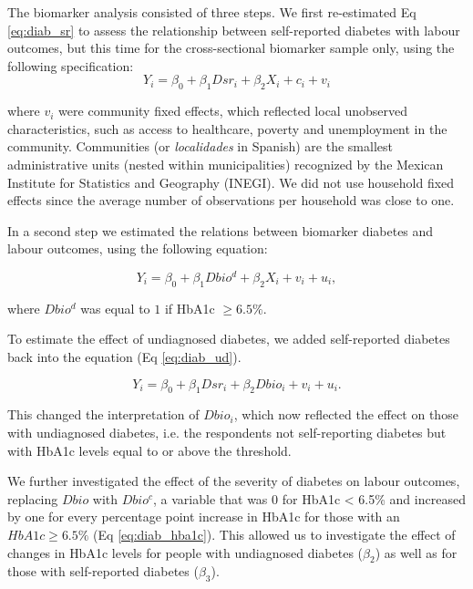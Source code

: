 \documentclass[12pt,english]{article}
\begin{document}
The biomarker analysis consisted of three steps. We first re-estimated Eq \ref{eq:diab_sr} to assess the relationship between self-reported diabetes with labour outcomes, but this time for the cross-sectional biomarker sample only, using the following specification:
\begin{equation}
Y_{i}=\beta_{0}+\beta_{1}Dsr_{i}+\beta_{2}X_{i}+c_{i}+v_{i}\label{eq:diab_sr}
\end{equation}

where $v_{i}$ were community fixed effects, which reflected local unobserved characteristics, such as access to healthcare, poverty and unemployment in the community. Communities (or \textit{localidades} in Spanish) are the smallest administrative units (nested within municipalities) recognized by the Mexican Institute for Statistics and Geography (INEGI). We did not use household fixed effects since the average number of observations per household was close to one.

In a second step we estimated the relations between biomarker diabetes and labour outcomes, using the following equation:

\begin{equation}
Y_{i}=\beta_{0}+\beta_{1}Dbio^{d}+\beta_{2}X_{i}+v_{i}+u_{i}\label{eq:diab},
\end{equation}

where $Dbio^{d}$ was equal to $1$ if \ac{HbA1c} $\geq 6.5\%$.

To estimate the effect of undiagnosed diabetes, we added self-reported diabetes back into the equation (Eq \ref{eq:diab_ud}).

\begin{equation}
Y_{i}=\beta_{0}+\beta_{1}Dsr_{i}+\beta_{2}Dbio_{i}+v_{i}+u_{i}.\label{eq:diab_ud}
\end{equation}

This changed the interpretation of $Dbio_{i}$, which now reflected the effect on those with undiagnosed diabetes, i.e. the respondents not self-reporting diabetes but with \ac{HbA1c} levels equal to or above the threshold. 

We further investigated the effect of the severity of diabetes on labour outcomes, replacing $Dbio$ with $Dbio^{c}$, a variable that was $0$ for \ac{HbA1c} < 6.5\% and increased by one for every percentage point increase in \ac{HbA1c} for those with an $HbA1c \geq 6.5\%$ (Eq \ref{eq:diab_hba1c}). This allowed us to investigate the effect of changes in \ac{HbA1c} levels for people with undiagnosed diabetes ($\beta_{2}$) as well as for those with self-reported diabetes ($\beta_{3}$).
\end{document}
